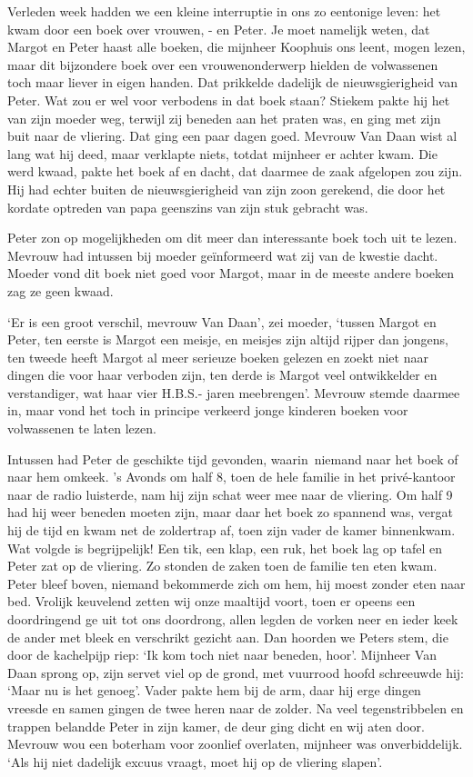 \documentclass{book}
\begin{document}
Verleden week hadden we een kleine interruptie in ons zo eentonige
leven: het kwam door een boek over vrouwen, - en Peter. Je moet namelijk
weten, dat Margot en Peter haast alle boeken, die mijnheer Koophuis ons
leent, mogen lezen, maar dit bijzondere boek over een vrouwenonderwerp
hielden de volwassenen toch maar liever in eigen handen. Dat prikkelde
dadelijk de nieuwsgierigheid van Peter. Wat zou er wel voor verbodens in
dat boek staan? Stiekem pakte hij het van zijn moeder weg, terwijl zij
beneden aan het praten was, en ging met zijn buit naar de vliering. Dat
ging een paar dagen goed. Mevrouw Van Daan wist al lang wat hij deed,
maar verklapte niets, totdat mijnheer er achter kwam. Die werd kwaad,
pakte het boek af en dacht, dat daarmee de zaak afgelopen zou zijn. Hij
had echter buiten de nieuwsgierigheid van zijn zoon gerekend, die door
het kordate optreden van papa geenszins van zijn stuk gebracht was.

Peter zon op mogelijkheden om dit meer dan interessante boek toch uit te
lezen. Mevrouw had intussen bij moeder geïnformeerd wat zij van de
kwestie dacht. Moeder vond dit boek niet goed voor Margot, maar in de
meeste andere boeken zag ze geen kwaad.

`Er is een groot verschil, mevrouw Van Daan', zei moeder, `tussen Margot
en Peter, ten eerste is Margot een meisje, en meisjes zijn altijd rijper
dan jongens, ten tweede heeft Margot al meer serieuze boeken gelezen en
zoekt niet naar dingen die voor haar verboden zijn, ten derde is Margot
veel ontwikkelder en verstandiger, wat haar vier H.B.S.- jaren
meebrengen'. Mevrouw stemde daarmee in, maar vond het toch in principe
verkeerd jonge kinderen boeken voor volwassenen te laten lezen.

Intussen had Peter de geschikte tijd gevonden, waarin~niemand naar het
boek of naar hem omkeek. 's Avonds om half 8, toen de hele familie in
het privé-kantoor naar de radio luisterde, nam hij zijn schat weer mee
naar de vliering. Om half 9 had hij weer beneden moeten zijn, maar daar
het boek zo spannend was, vergat hij de tijd en kwam net de zoldertrap
af, toen zijn vader de kamer binnenkwam. Wat volgde is begrijpelijk! Een
tik, een klap, een ruk, het boek lag op tafel en Peter zat op de
vliering. Zo stonden de zaken toen de familie ten eten kwam. Peter bleef
boven, niemand bekommerde zich om hem, hij moest zonder eten naar bed.
Vrolijk keuvelend zetten wij onze maaltijd voort, toen er opeens een
doordringend ge uit tot ons doordrong, allen legden de vorken neer en
ieder keek de ander met bleek en verschrikt gezicht aan. Dan hoorden we
Peters stem, die door de kachelpijp riep: `Ik kom toch niet naar
beneden, hoor'. Mijnheer Van Daan sprong op, zijn servet viel op de
grond, met vuurrood hoofd schreeuwde hij: `Maar nu is het genoeg'. Vader
pakte hem bij de arm, daar hij erge dingen vreesde en samen gingen de
twee heren naar de zolder. Na veel tegenstribbelen en trappen belandde
Peter in zijn kamer, de deur ging dicht en wij aten door. Mevrouw wou
een boterham voor zoonlief overlaten, mijnheer was onverbiddelijk. `Als
hij niet dadelijk excuus vraagt, moet hij op de vliering slapen'.
\end{document}
